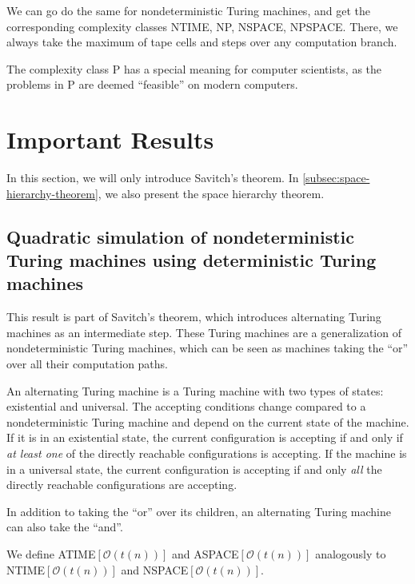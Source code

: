 We can go do the same for nondeterministic Turing machines, and get the corresponding complexity classes NTIME, NP, NSPACE, NPSPACE\@.
There, we always take the maximum of tape cells and steps over any computation branch.

The complexity class P has a special meaning for computer scientists, as the problems in P are deemed ``feasible'' on modern computers.


\section{Important Results}\label{sec:important-results}

In this section, we will only introduce Savitch's theorem.
In \cref{subsec:space-hierarchy-theorem}, we also present the space hierarchy theorem.

\subsection{Quadratic simulation of nondeterministic Turing machines using deterministic Turing machines}\label{subsec:nspacesubsetdspacesquared}

This result is part of Savitch's theorem, which introduces alternating Turing machines as an intermediate step.
These Turing machines are a generalization of nondeterministic Turing machines, which can be seen as machines taking the ``or'' over all their computation paths.

\begin{define}
    An alternating Turing machine is a Turing machine with two types of states: existential and universal.
    The accepting conditions change compared to a nondeterministic Turing machine and depend on the current state of the machine.
    If it is in an existential state, the current configuration is accepting if and only if \emph{at least one} of the directly reachable configurations is accepting.
    If the machine is in a universal state, the current configuration is accepting if and only \emph{all} the directly reachable configurations are accepting.
\end{define}

In addition to taking the ``or'' over its children, an alternating Turing machine can also take the ``and''.

\sloppy We define ATIME$[\mathcal{O}(t(n))]$ and ASPACE$[\mathcal{O}(t(n))]$ analogously to NTIME$[\mathcal{O}(t(n))]$ and NSPACE$[\mathcal{O}(t(n))]$.


